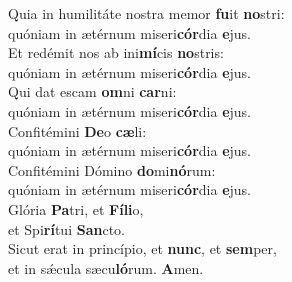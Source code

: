 \evenverse Quia in humilitáte nostra memor \textbf{fu}it \textbf{no}stri:~\*\\
\evenverse quóniam in ætérnum miseri\textbf{cór}dia \textbf{e}jus.\\
\oddverse Et redémit nos ab ini\textbf{mí}cis \textbf{no}stris:~\*\\
\oddverse quóniam in ætérnum miseri\textbf{cór}dia \textbf{e}jus.\\
\evenverse Qui dat escam \textbf{om}ni \textbf{car}ni:~\*\\
\evenverse quóniam in ætérnum miseri\textbf{cór}dia \textbf{e}jus.\\
\oddverse Confitémini \textbf{De}o \textbf{cæ}li:~\*\\
\oddverse quóniam in ætérnum miseri\textbf{cór}dia \textbf{e}jus.\\
\evenverse Confitémini Dómino \textbf{do}mi\textbf{nó}rum:~\*\\
\evenverse quóniam in ætérnum miseri\textbf{cór}dia \textbf{e}jus.\\
\oddverse Glória \textbf{Pa}tri, et \textbf{Fí}\textbf{li}o,~\*\\
\oddverse et Spi\textbf{rí}tui \textbf{San}cto.\\
\evenverse Sicut erat in princípio, et \textbf{nunc}, et \textbf{sem}per,~\*\\
\evenverse et in sǽcula sæcu\textbf{ló}rum. \textbf{A}men.\\
